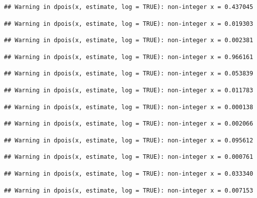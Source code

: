 \documentclass[]{article}
\begin{document}
\begin{verbatim}
## Warning in dpois(x, estimate, log = TRUE): non-integer x = 0.437045
\end{verbatim}

\begin{verbatim}
## Warning in dpois(x, estimate, log = TRUE): non-integer x = 0.019303
\end{verbatim}

\begin{verbatim}
## Warning in dpois(x, estimate, log = TRUE): non-integer x = 0.002381
\end{verbatim}

\begin{verbatim}
## Warning in dpois(x, estimate, log = TRUE): non-integer x = 0.966161
\end{verbatim}

\begin{verbatim}
## Warning in dpois(x, estimate, log = TRUE): non-integer x = 0.053839
\end{verbatim}

\begin{verbatim}
## Warning in dpois(x, estimate, log = TRUE): non-integer x = 0.011783
\end{verbatim}

\begin{verbatim}
## Warning in dpois(x, estimate, log = TRUE): non-integer x = 0.000138
\end{verbatim}

\begin{verbatim}
## Warning in dpois(x, estimate, log = TRUE): non-integer x = 0.002066
\end{verbatim}

\begin{verbatim}
## Warning in dpois(x, estimate, log = TRUE): non-integer x = 0.095612
\end{verbatim}

\begin{verbatim}
## Warning in dpois(x, estimate, log = TRUE): non-integer x = 0.000761
\end{verbatim}

\begin{verbatim}
## Warning in dpois(x, estimate, log = TRUE): non-integer x = 0.033340
\end{verbatim}

\begin{verbatim}
## Warning in dpois(x, estimate, log = TRUE): non-integer x = 0.007153
\end{verbatim}
\end{document}

